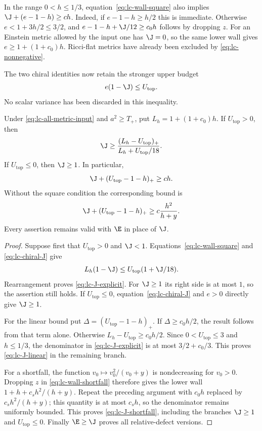 In the range $0<h\le1/3$, equation~\eqref{eq:lc-wall-square} also
implies $\J+(e-1-h)\ge ch$.  Indeed, if $e-1-h\ge h/2$ this is
immediate.  Otherwise $e<1+3h/2\le3/2$, and
$e-1-h+\J/12\ge c_0h$ follows by dropping $z$.
For an Einstein metric allowed by the input one has $\J=0$, so the
same lower wall gives $e\ge1+(1+c_0)h$.  Ricci-flat metrics have
already been excluded by \eqref{eq:lc-nonnegative}.

The two chiral identities now retain the stronger upper budget
\begin{equation}\label{eq:lc-chiral-J}
 e(1-\J)\le U_{\mathrm{top}}.
\end{equation}
No scalar variance has been discarded in this inequality.

\begin{theorem}\label{thm:linear-window}
Under \eqref{eq:lc-all-metric-input} and $a^2\ge T_+$, put
$L_h=1+(1+c_0)h$.  If $U_{\mathrm{top}}>0$, then
\begin{equation}\label{eq:lc-J-explicit}
 \J\ge\frac{(L_h-U_{\mathrm{top}})_+}
                    {L_h+U_{\mathrm{top}}/18}.
\end{equation}
If $U_{\mathrm{top}}\le0$, then $\J\ge1$.  In particular,
\begin{equation}\label{eq:lc-J-linear}
 \J+(U_{\mathrm{top}}-1-h)_+\ge ch.
\end{equation}
Without the square condition the corresponding bound is
\begin{equation}\label{eq:lc-J-shortfall}
 \J+(U_{\mathrm{top}}-1-h)_+
       \ge c\frac{h^2}{h+y}.
\end{equation}
Every assertion remains valid with $\E$ in place of $\J$.
\end{theorem}

\begin{proof}
Suppose first that $U_{\mathrm{top}}>0$ and $\J<1$.
Equations~\eqref{eq:lc-wall-square} and \eqref{eq:lc-chiral-J}
give
\[
 L_h(1-\J)\le U_{\mathrm{top}}(1+\J/18).
\]
Rearrangement proves \eqref{eq:lc-J-explicit}.  For $\J\ge1$
its right side is at most $1$, so the assertion still holds.
If $U_{\mathrm{top}}\le0$, equation~\eqref{eq:lc-chiral-J}
and $e>0$ directly give $\J\ge1$.

For the linear bound put $\Delta=(U_{\mathrm{top}}-1-h)_+$.
If $\Delta\ge c_0h/2$, the result follows from that term alone.
Otherwise $L_h-U_{\mathrm{top}}\ge c_0h/2$.  Since
$0<U_{\mathrm{top}}\le3$ and $h\le1/3$, the denominator in
\eqref{eq:lc-J-explicit} is at most $3/2+c_0/3$.
This proves \eqref{eq:lc-J-linear} in the remaining branch.

For a shortfall, the function $v_0\mapsto v_0^2/(v_0+y)$ is
nondecreasing for $v_0>0$.  Dropping $z$ in
\eqref{eq:lc-wall-shortfall} therefore gives the lower wall
$1+h+c_s h^2/(h+y)$.  Repeat the preceding argument with
$c_0h$ replaced by $c_s h^2/(h+y)$; this quantity is at most
$c_sh$, so the denominator remains uniformly bounded.
This proves \eqref{eq:lc-J-shortfall}, including the branches
$\J\ge1$ and $U_{\mathrm{top}}\le0$.  Finally $\E\ge\J$
proves all relative-defect versions.
\end{proof}

